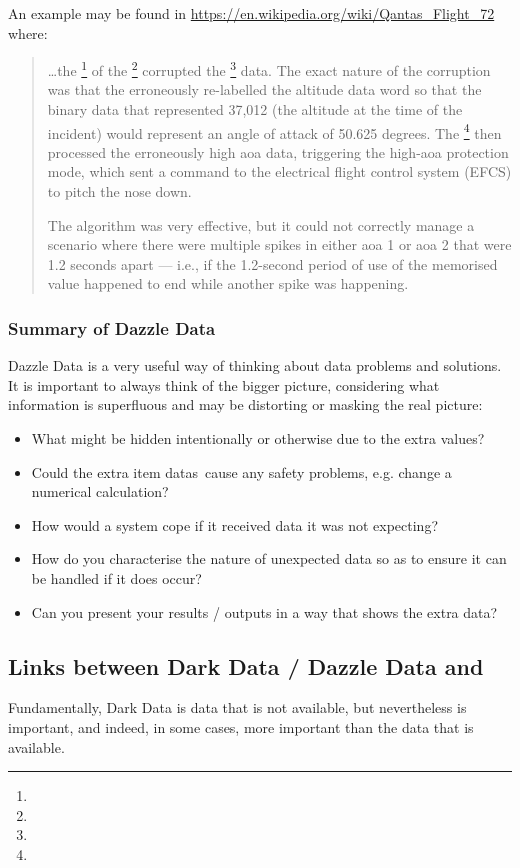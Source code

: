 An example may be found in
\href{https://en.wikipedia.org/wiki/Qantas\_Flight\_72}{https://en.wikipedia.org/wiki/Qantas\_Flight\_72}
where:
\begin{quotation}
  \dots the \footnote{} of the \footnote{} corrupted the \footnote{} data. The exact nature of the corruption was that the   erroneously re-labelled the altitude data word so that the binary data that represented 37,012 (the altitude at the time of the incident) would represent an angle of attack of 50.625 degrees. The \footnote{} then processed the erroneously high \gls{aoa} data, triggering the high-\gls{aoa} protection mode, which sent a command to the electrical flight control system (EFCS) to pitch the nose down.
  
  The  algorithm was very effective, but it could not correctly manage a scenario where there were multiple spikes in either \gls{aoa} 1 or \gls{aoa} 2 that were 1.2 seconds apart --- i.e., if the 1.2-second period of use of the memorised value happened to end while another spike was happening.
  \end{quotation}
\subsubsection{Summary of Dazzle Data}
Dazzle Data is a very useful way of thinking about data problems and solutions.
It is important to always think of the bigger picture,
considering what \gls{information} is superfluous and may be distorting or masking the real picture:
\begin{itemize}
    \item What might be hidden intentionally or otherwise due to the extra values?
    \item Could the extra \cbstart\glspl{item data}\cbend\ cause any safety problems, e.g. change a numerical calculation?
    \item How would a system cope if it received data it was not expecting?
    \item How do you characterise the nature of unexpected data so as to ensure it can be handled if it does occur?
    \item Can you present your results / outputs in a way that shows the extra data?
\end{itemize}
%
%
\subsection{Links between Dark Data / Dazzle Data and }
Fundamentally, Dark Data is data that is not available, but nevertheless is important, and indeed, in some cases, more important than the data that is available.

